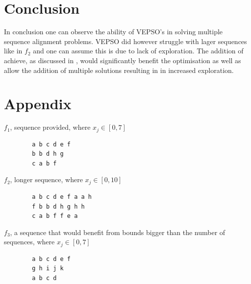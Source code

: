 \documentclass[conference]{IEEEtran}
\begin{document}
\newpage
\section{Conclusion}
In conclusion one can observe the ability of \ac{VEPSO}'s in solving multiple sequence alignment problems. \ac{VEPSO} did however struggle with lager sequences like in $f_2$ and one can assume this is due to lack of exploration. The addition of achieve, as discussed in \cite{kian-lim:pso}, would significantly benefit the optimisation as well as allow the addition of multiple solutions resulting in in increased exploration.

\newpage

\nocite{*}
\noindent

\indent


\section{Appendix}

$f_1$, sequence provided, where $x_j \in [0, 7]$
\begin{lstlisting}
        a b c d e f
        b b d h g
        c a b f
\end{lstlisting}

$f_2$, longer sequence, where $x_j \in [0, 10]$
\begin{lstlisting}
        a b c d e f a a h
        f b b d h g h h
        c a b f f e a
\end{lstlisting}

$f_3$, a sequence that would benefit from bounds bigger than the number of sequences, where $x_j \in [0, 7]$
\begin{lstlisting}
        a b c d e f
        g h i j k
        a b c d
\end{lstlisting}
\end{document}
